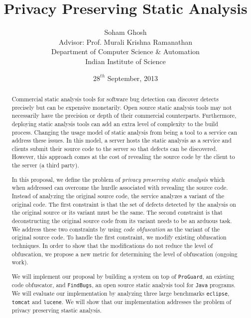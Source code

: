 \documentclass[twocolumn]{article}
\begin{document}
\title{\huge \bf Privacy Preserving Static Analysis }
\author{Soham Ghosh\\Advisor: Prof. Murali Krishna Ramanathan\\Department of Computer Science \& Automation\\Indian Institute of Science} 
\date{$28^{th}$ September, 2013}
\maketitle
\thispagestyle{empty}
%
\begin{abstract}
Commercial static analysis tools for software bug detection can discover detects precisely 
but can be expensive monetarily. Open source static analysis tools may not necessarily have 
the precision or depth of their commercial counterparts. Furthermore, deploying static 
analysis tools can add an extra level of complexity to the build process. Changing the usage 
model of static analysis from being a tool to a service can address these issues. In this model, 
a server hosts the static analysis as a service and clients submit their source code to the 
server so that defects can be discovered. However, this approach comes at the cost of revealing 
the source code by the client to the server (a third party). 

In this proposal, we define the problem of {\em privacy preserving static analysis} which 
when addressed can overcome the hurdle associated with revealing the source code. Instead of 
analyzing the original source code, the service analyzes a variant of the original code. 
The first constraint is that the set of defects detected by the analysis on the original source 
or its variant must be the same. The second constraint is that deconstructing the original source code from its variant 
needs to be an arduous task. We address these  two constraints by using {\em code obfuscation} as the 
variant of the original source code. To handle the first constraint, we modify existing 
obfuscation techniques. In order to show that the modifications do not reduce the level of 
obfuscation, we propose a new metric for determining the level of obfuscation (ongoing work). 
 
We will implement our proposal by building a system on top of {\tt ProGuard}, an existing code obfuscator, 
and {\tt FindBugs}, an open source static analysis tool for {\tt Java} programs. We will evaluate our 
implementation by analyzing three large benchmarks {\tt eclipse}, {\tt tomcat} and {\tt lucene}. 
We will show that our implementation addresses the problem of privacy preserving stastic analysis. 
\end{abstract}
\end{document}
